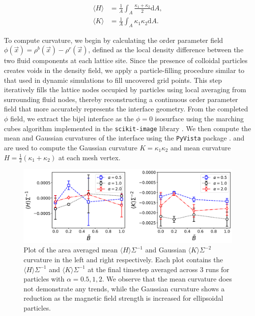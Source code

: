 \begin{align}
\langle H \rangle &= \frac{1}{A}\int_A \frac{\kappa_1+\kappa_2}{2} \mathrm{d}A , \\
\langle K \rangle &= \frac{1}{A}\int_A \kappa_1\kappa_2 \mathrm{d}A .
\end{align} 

To compute curvature, we begin by calculating 
the order parameter field \(\phi(\vec{x}) = \rho^{b}(\vec{x}) - \rho^{r}(\vec{x})\), defined as the local density difference between the two fluid components at each lattice site. Since the presence 
of colloidal particles creates voids in the density field, we apply a particle-filling procedure similar to that used in dynamic simulations to fill uncovered grid points. This step iteratively fills 
the lattice nodes occupied by particles using local averaging from surrounding fluid nodes, thereby reconstructing a continuous order parameter field that more accurately represents the interface geometry.
From the completed \(\phi\) field, we extract the bijel interface as the \(\phi = 0\) isosurface using the marching cubes algorithm implemented in the \texttt{scikit-image} library \cite{van2014scikit}. 
We then compute the mean and Gaussian curvatures of the interface using the \texttt{PyVista} package \cite{sullivan2019pyvista}. and are used to compute the Gaussian curvature \(K = \kappa_1 \kappa_2\) and mean curvature \(H = \frac{1}{2}(\kappa_1 + \kappa_2)\) at each mesh vertex.


\begin{figure}
    \centering
\includegraphics[scale=0.5]{../figures/results/paper1_5/curvature_field.png}%
\caption{Plot of the area averaged mean $\langle H \rangle \Sigma^{-1}$ and Gaussian $\langle K \rangle \Sigma^{-2}$ curvature in the left and right 
         respectively. Each plot contains the $\langle H \rangle \Sigma^{-1}$ and $\langle K \rangle \Sigma^{-1}$ at the final timestep averaged across 
         3 runs for particles with $\alpha = 0.5, 1, 2$. We observe that the mean curvature does not demonstrate any trends, while the Gaussian curvature 
         shows a reduction as the magnetic field strength is increased for ellipsoidal particles.}
\label{fig:curvature_field}%
\end{figure}

